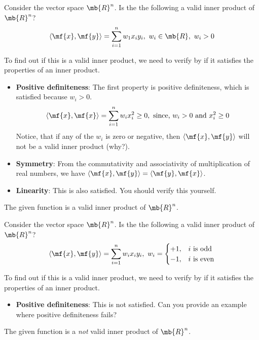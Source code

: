 \begin{boxedstuff}
\begin{problem}
    Consider the vector space $\mb{R}^n$. Is the the following a valid inner product of $\mb{R}^n$?
    \[ \langle \mf{x}, \mf{y}\rangle = \sum_{i=1}^n w_1 x_i y_i, \,\, w_i \in \mb{R}, \,\, w_i > 0 \]
    \begin{solution}
        To find out if this is a valid inner product, we need to verify by if it satisfies the properties of an inner product. 
        \begin{itemize}
            \item \textbf{Positive definiteness}: The first property is positive definiteness, which is satisfied because $w_i > 0$.
            \[ \langle \mf{x}, \mf{x} \rangle = \sum_{i=1}^n w_i x_i^2 \geq 0, \,\, \text{since, } w_i > 0 \text{ and } x_i^2 \geq 0 \]
            Notice, that if any of the $w_i$ is zero or negative, then $\langle \mf{x}, \mf{y} \rangle$ will not be a valid inner product (why?).
            \item \textbf{Symmetry}: From the commutativity and associativity of multiplication of real numbers, we have $\langle \mf{x}, \mf{y} \rangle = \langle \mf{y}, \mf{x} \rangle$. 
        
            \item\textbf{Linearity}: This is also satisfied. You should verify this yourself.
        \end{itemize}
        The given function is a valid inner product of $\mb{R}^n$.
    \end{solution}
\end{problem}
\begin{problem}
    Consider the vector space $\mb{R}^n$. Is the the following a valid inner product of $\mb{R}^n$?
    \[ \langle \mf{x}, \mf{y}\rangle = \sum_{i=1}^n w_i x_i y_i, \,\, w_i = \begin{cases} +1, & i \text{ is odd} \\  -1, & i \text{ is even}\end{cases} \]
    \begin{solution}
        To find out if this is a valid inner product, we need to verify by if it satisfies the properties of an inner product. 
        \begin{itemize}
            \item \textbf{Positive definiteness}: This is not satisfied. Can you provide an example where positive definiteness fails?
        \end{itemize}
        The given function is a \textit{not} valid inner product of $\mb{R}^n$.
    \end{solution}
\end{problem}
\end{boxedstuff}

